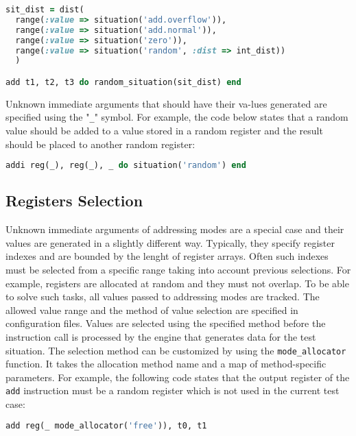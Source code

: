 \documentclass[oneside,final,12pt]{extreport}
\begin{document}
\begin{lstlisting}[language=ruby, emph={situation, random_situation, dist, range}]
sit_dist = dist(
  range(:value => situation('add.overflow')),
  range(:value => situation('add.normal')),
  range(:value => situation('zero')),
  range(:value => situation('random', :dist => int_dist))
  )

add t1, t2, t3 do random_situation(sit_dist) end
\end{lstlisting}

Unknown immediate arguments that should have their va-lues generated are specified using
the "{\tt \_}" symbol. For example, the code below states that a random value should be added
to a value stored in a random register and the result should be placed to another random register:

\begin{lstlisting}[language=ruby, emph={situation}]
addi reg(_), reg(_), _ do situation('random') end
\end{lstlisting}

\subsection{Registers Selection}

Unknown immediate arguments of addressing modes are a special case and their values are
generated in a slightly different way. Typically, they specify register indexes and are bounded
by the lenght of register arrays. Often such indexes must be selected from a specific range
taking into account previous selections. For example, registers are allocated at random and they
must not overlap. To be able to solve such tasks, all values passed to addressing modes are tracked.
The allowed value range and the method of value selection are specified in configuration files.
Values are selected using the specified method before the instruction call is processed by the
engine that generates data for the test situation. The selection method can be customized by using
the  {\tt mode{\_}allocator} function. It takes the allocation method name and a map of
method-specific parameters. For example, the following code states that the output register
of the {\tt add} instruction must be a random register which is not used in the current test case:

\begin{lstlisting}[language=ruby, emph={situation, mode_allocator}]
add reg(_ mode_allocator('free')), t0, t1
\end{lstlisting}
\end{document}
